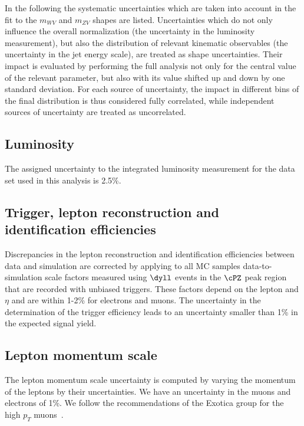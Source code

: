 In the following the systematic uncertainties which are taken into
account in the fit to the $m_{WV}$ and $m_{ZV}$ shapes are listed.  
Uncertainties which do not only influence the overall normalization
(\eg the uncertainty in the luminosity measurement), but also the
distribution of relevant kinematic observables (\eg the uncertainty in
the jet energy scale), are treated as shape uncertainties. Their
impact is evaluated by performing the full analysis not only for the
central value of the relevant parameter, but also with its value
shifted up and down by one standard deviation. For
each source of uncertainty, the impact in different bins of the final 
distribution is thus considered fully correlated, while
independent sources of uncertainty are treated as uncorrelated. 

\subsection{Luminosity}

The assigned uncertainty to the integrated luminosity measurement for
the data set used in this analysis is 2.5\%.

\subsection{Trigger, lepton reconstruction and identification efficiencies}

Discrepancies in the lepton reconstruction and identification
efficiencies between data and simulation are corrected by applying
to all MC samples 
data-to-simulation scale factors measured using $\dyll$ events in the $\cPZ$
peak region~\cite{wzxs} that are recorded with unbiased triggers. These factors
depend on the lepton \pt and $\eta$ and are within 1-2\% for electrons and muons.
The uncertainty in the determination of the trigger efficiency leads to an uncertainty smaller than 1\% in the expected signal yield. 

\subsection{Lepton momentum scale}

The lepton momentum scale uncertainty is computed by varying the
momentum of the leptons by their uncertainties. We have an 
uncertainty in the muons and electrons of 1\%. We follow the recommendations of the Exotica group for the high $p_{T}$ muons~\cite{Twiki:EXO-MUODocumentationRun2}.

